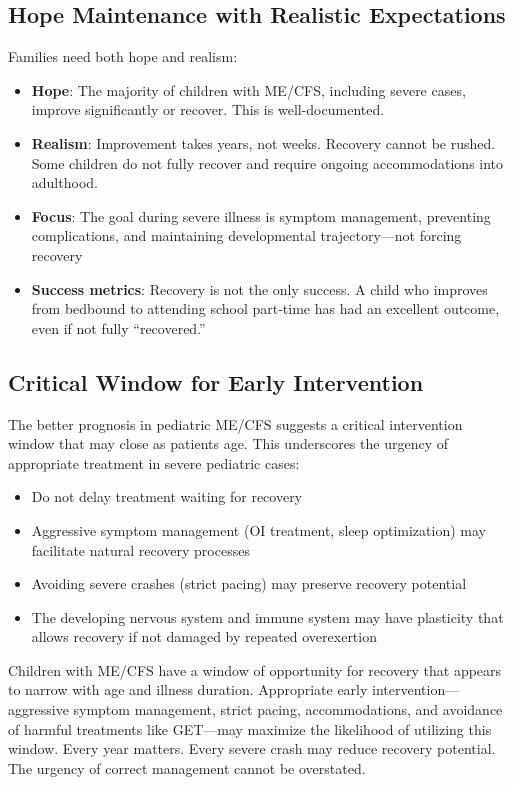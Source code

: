 \subsection{Hope Maintenance with Realistic Expectations}

Families need both hope and realism:

\begin{itemize}
    \item \textbf{Hope}: The majority of children with ME/CFS, including severe cases, improve significantly or recover. This is well-documented.
    \item \textbf{Realism}: Improvement takes years, not weeks. Recovery cannot be rushed. Some children do not fully recover and require ongoing accommodations into adulthood.
    \item \textbf{Focus}: The goal during severe illness is symptom management, preventing complications, and maintaining developmental trajectory---not forcing recovery
    \item \textbf{Success metrics}: Recovery is not the only success. A child who improves from bedbound to attending school part-time has had an excellent outcome, even if not fully ``recovered.''
\end{itemize}

\subsection{Critical Window for Early Intervention}

The better prognosis in pediatric ME/CFS suggests a critical intervention window that may close as patients age. This underscores the urgency of appropriate treatment in severe pediatric cases:

\begin{itemize}
    \item Do not delay treatment waiting for recovery
    \item Aggressive symptom management (OI treatment, sleep optimization) may facilitate natural recovery processes
    \item Avoiding severe crashes (strict pacing) may preserve recovery potential
    \item The developing nervous system and immune system may have plasticity that allows recovery if not damaged by repeated overexertion
\end{itemize}

\begin{keypoint}
Children with ME/CFS have a window of opportunity for recovery that appears to narrow with age and illness duration. Appropriate early intervention---aggressive symptom management, strict pacing, accommodations, and avoidance of harmful treatments like GET---may maximize the likelihood of utilizing this window. Every year matters. Every severe crash may reduce recovery potential. The urgency of correct management cannot be overstated.
\end{keypoint}

